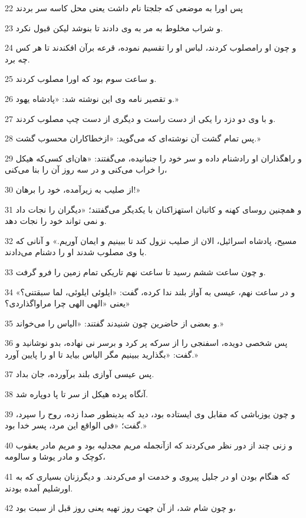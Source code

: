 \par 22 پس اورا به موضعی که جلجتا نام داشت یعنی محل کاسه سر بردند
\par 23 و شراب مخلوط به مر به وی دادند تا بنوشد لیکن قبول نکرد.
\par 24 و چون او رامصلوب کردند، لباس او را تقسیم نموده، قرعه برآن افکندند تا هر کس چه برد.
\par 25 و ساعت سوم بود که اورا مصلوب کردند.
\par 26 و تقصیر نامه وی این نوشته شد: «پادشاه یهود.»
\par 27 و با وی دو دزد را یکی از دست راست و دیگری از دست چپ مصلوب کردند.
\par 28 پس تمام گشت آن نوشته‌ای که می‌گوید: «ازخطاکاران محسوب گشت.»
\par 29 و راهگذاران او رادشنام داده و سر خود را جنبانیده، می‌گفتند: «هان‌ای کسی‌که هیکل را خراب می‌کنی و در سه روز آن را بنا می‌کنی،
\par 30 از صلیب به زیرآمده، خود را برهان!»
\par 31 و همچنین روسای کهنه و کاتبان استهزاکنان با یکدیگر می‌گفتند؛ «دیگران را نجات داد و نمی تواند خود را نجات دهد.
\par 32 مسیح، پادشاه اسرائیل، الان از صلیب نزول کند تا ببینیم و ایمان آوریم.» و آنانی که با وی مصلوب شدند او را دشنام می‌دادند.
\par 33 و چون ساعت ششم رسید تا ساعت نهم تاریکی تمام زمین را فرو گرفت.
\par 34 و در ساعت نهم، عیسی به آواز بلند ندا کرده، گفت: «ایلوئی ایلوئی، لما سبقتنی؟» یعنی «الهی الهی چرا مراواگذاردی؟»
\par 35 و بعضی از حاضرین چون شنیدند گفتند: «الیاس را می‌خواند.»
\par 36 پس شخصی دویده، اسفنجی را از سرکه پر کرد و برسر نی نهاده، بدو نوشانید و گفت: «بگذارید ببینیم مگر الیاس بیاید تا او را پایین آورد.»
\par 37 پس عیسی آوازی بلند برآورده، جان بداد.
\par 38 آنگاه پرده هیکل از سر تا پا دوپاره شد.
\par 39 و چون یوزباشی که مقابل وی ایستاده بود، دید که بدینطور صدا زده، روح را سپرد، گفت؛ «فی الواقع این مرد، پسر خدا بود.»
\par 40 و زنی چند از دور نظر می‌کردند که ازآنجمله مریم مجدلیه بود و مریم مادر یعقوب کوچک و مادر یوشا و سالومه،
\par 41 که هنگام بودن او در جلیل پیروی و خدمت او می‌کردند. و دیگرزنان بسیاری که به اورشلیم آمده بودند.
\par 42 و چون شام شد، از آن جهت روز تهیه یعنی روز قبل از سبت بود،
